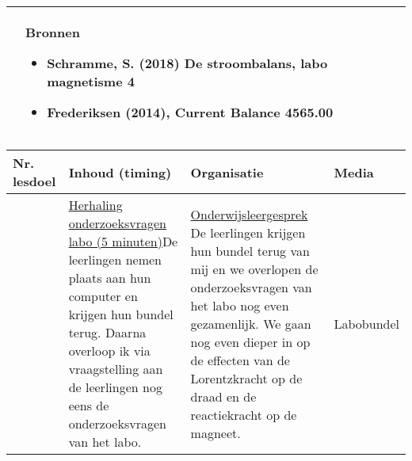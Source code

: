 \begin{landscape}
\begin{tabularx}{1.56\textwidth}{|p{}|X|}
		\\ \cline{2-2}
		  & \textbf{Bronnen}\begin{itemize}
		  	\item Schramme, S. (2018) De stroombalans, labo magnetisme 4
		  	\item Frederiksen (2014), Current Balance 4565.00
		  \end{itemize}\\ \hline
	\end{tabularx}


\newpage
	
	\begin{tabularx}{1.56\textwidth}{|p{1.5cm}|p{9cm}|X|p{4cm}|}
		\hline
		\textbf{Nr. lesdoel } & \textbf{Inhoud (timing)}  & \textbf{Organisatie } & \textbf{Media } \\ \hline
		&\underline{Herhaling onderzoeksvragen} \underline{labo (5 minuten)}\newline De leerlingen nemen plaats aan hun computer en krijgen hun bundel terug. Daarna overloop ik via vraagstelling aan de leerlingen nog eens de onderzoeksvragen van het labo.
		&  \underline{Onderwijsleergesprek}\newline 
			De leerlingen krijgen hun bundel terug van mij en we overlopen de onderzoeksvragen van het labo nog even gezamenlijk. We gaan nog even dieper in op de effecten van de Lorentzkracht op de draad en de reactiekracht op de magneet. 
		&  Labobundel
		\\ \hline
	\end{tabularx}\vspace{5mm}


\end{landscape}
